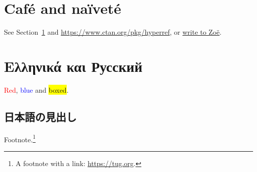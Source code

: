 \documentclass{article}
\begin{document}
\tableofcontents
\section{Café and naïveté}\label{s:cafe}
See Section~\ref{s:cafe} and \url{https://www.ctan.org/pkg/hyperref}, or
\href{mailto:zoe@example.org}{write to Zoë}.
\section{Ελληνικά και Русский}
\textcolor{red}{Red}, \textcolor{blue}{blue} and \colorbox{yellow}{boxed}.
\subsection{日本語の見出し}
Footnote.\footnote{A footnote with a link: \url{https://tug.org}.}
\end{document}
